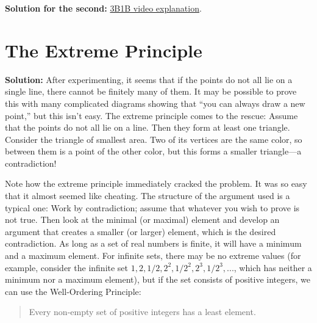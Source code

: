 \documentclass[12pt]{article}
\begin{document}
\textbf{Solution for the second:} \href{https://www.youtube.com/watch?v=OkmNXy7er84}{3B1B video explanation}.

\section{The Extreme Principle}

\textbf{Solution:} After experimenting, it seems that if the points do not all lie on a single line, there cannot
be finitely many of them. It may be possible to prove this with many complicated diagrams showing
that “you can always draw a new point,” but this isn't easy. The extreme principle comes to the rescue:
Assume that the points do not all lie on a line. Then they form at least one triangle. Consider the
triangle of smallest area. Two of its vertices are the same color, so between them is a point of the other
color, but this forms a smaller triangle—a contradiction!

Note how the extreme principle immediately cracked the problem. It was so easy that it almost
seemed like cheating. The structure of the argument used is a typical one: Work by contradiction;
assume that whatever you wish to prove is not true. Then look at the minimal (or maximal) element and
develop an argument that creates a smaller (or larger) element, which is the desired contradiction. As
long as a set of real numbers is finite, it will have a minimum and a maximum element. For infinite sets,
there may be no extreme values (for example, consider the infinite set ${1, 2, 1/2, 2^2, 1/2^2, 2^3, 1/2^3, ...}$,
which has neither a minimum nor a maximum element), but if the set consists of positive integers, we
can use the Well-Ordering Principle:

\begin{quote}
Every non-empty set of positive integers has a least element.
\end{quote}
\end{document}
